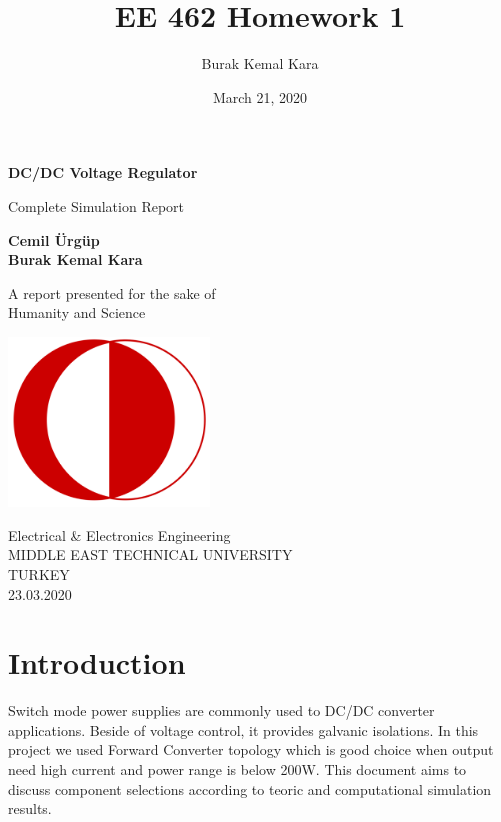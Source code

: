 \documentclass{article}
\title{EE 462 Homework 1}
\author{Burak Kemal Kara}
\date{March 21, 2020}
\begin{document}
\begin{titlepage}
    \begin{center}
        \vspace*{1cm}
            
        \Huge
        \textbf{DC/DC Voltage Regulator}
            
        \vspace{0.5cm}
        \LARGE
        Complete Simulation Report
            
        \vspace{1.5cm}
            
        \textbf{Cemil Ürgüp}\\
        \textbf{Burak Kemal Kara}
            
        \vfill
            
        A report presented for the sake of\\
        Humanity and Science
            
        \vspace{0.8cm}
            
        \includegraphics[width=0.4\textwidth]{logo.png}
            
        \Large
        Electrical \& Electronics Engineering\\
        MIDDLE EAST TECHNICAL UNIVERSITY\\
        TURKEY\\
        23.03.2020
            
    \end{center}
\end{titlepage}
\tableofcontents
\newpage
\section{Introduction}
Switch mode power supplies are commonly used to DC/DC converter applications. 
Beside of voltage control, it provides galvanic isolations. 
In this project we used Forward Converter topology which is good choice when output need high current and power range is below 200W. 
This document aims to discuss component selections according to teoric and computational simulation results.
\end{document}
